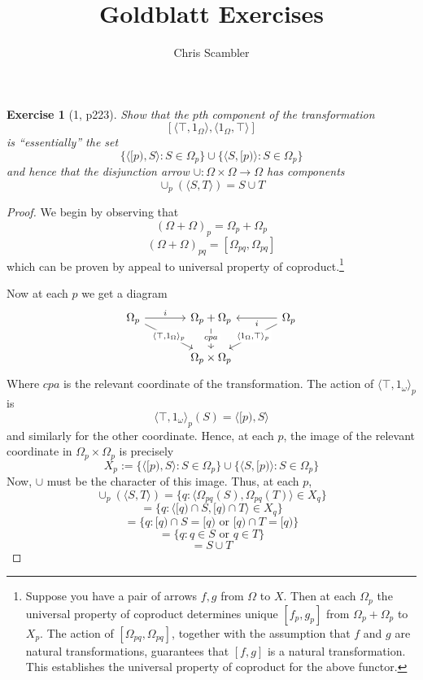 \documentclass{asl}
\title{Goldblatt Exercises}
\author{Chris Scambler}
\newtheorem{Exercise}[Theorem]{Exercise}
\theoremstyle{definition}
\begin{document}
 
\maketitle

\begin{Exercise}[1, p223]
Show that the $p$th component of the transformation
\[[\langle \top, 1_\Omega \rangle, \langle 1_\Omega, \top \rangle]\]
is ``essentially'' the set 
\[\{\langle [p), S \rangle : S \in \Omega_p\} \cup \{\langle S, [p) \rangle : S \in \Omega_p \}\]
and hence that the disjunction arrow $\cup : \Omega \times \Omega \to \Omega$ has components 
\[\cup_p(\langle S, T \rangle) = S \cup T\]
\end{Exercise}
\begin{proof}
We begin by observing that
\[(\Omega + \Omega)_p = \Omega_p + \Omega_p\]
\[(\Omega+\Omega)_{pq} = [\Omega_{pq}, \Omega_{pq}]\]
which can be proven by appeal to universal property of coproduct.\footnote{Suppose you have a pair of arrows $f, g$ from $\Omega$ to $X$. Then at each $\Omega_p$ the universal property of coproduct determines unique $[f_p, g_p]$ from $\Omega_p + \Omega_p$ to $X_p$. The action of $[\Omega_{pq}, \Omega_{pq}]$, together with the assumption that $f$ and $g$ are natural transformations, guarantees that $[f, g]$ is a natural transformation. This establishes the universal property of coproduct for the above functor.}

Now at each $p$ we get a diagram
$$\begin{tikzcd}[column sep = large] 
\Omega_p \arrow[r,"i"] \arrow[rd, "{\langle \top, 1_\Omega \rangle_p}" description]  & \Omega_p + \Omega_p \arrow[d,"cpa" description] & \Omega_p \arrow[l,"i"] \arrow[ld, "{\langle 1_\Omega , \top  \rangle_p}" description]\\
&\Omega_p \times \Omega_p&
\end{tikzcd}$$
Where $cpa$ is the relevant coordinate of the transformation. The action of $\langle \top, 1_\omega \rangle_p$ is
\[ \langle \top, 1_\omega \rangle_p(S) = \langle [p), S \rangle\]
and similarly for the other coordinate. Hence, at each $p$, the image of the relevant coordinate in $\Omega_p \times \Omega_p$ is precisely 
\[X_p := \{\langle [p), S \rangle : S \in \Omega_p\} \cup \{\langle S, [p) \rangle : S \in \Omega_p \}\]
Now, $\cup$ must be the character of this image. Thus, at each $p$,
\[\cup_p(\langle S, T \rangle) = \{q : \langle \Omega_{pq}(S), \Omega_{pq}(T) \rangle \in X_q\}\]
\[= \{q : \langle [q) \cap S, [q) \cap T \rangle \in X_q\} \]
\[ = \{q : [q) \cap S = [q) \text{ or } [q) \cap T = [q)\} \]
\[ = \{q : q \in S \text{ or } q \in T\} \]
\[ = S \cup T \]

\end{proof}
\end{document}
